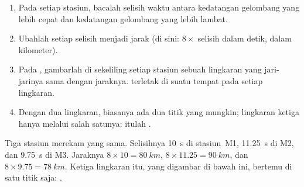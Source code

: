 \begin{method}\label{met:g7:earthquakes:three-circles}
\begin{enumerate}
  \item Pada  setiap stasiun, bacalah selisih waktu antara
        kedatangan gelombang yang lebih cepat dan kedatangan gelombang yang
        lebih lambat.
  \item Ubahlah setiap selisih menjadi jarak (di sini: $8 \times$ selisih
        dalam detik, dalam kilometer).
  \item Pada , gambarlah di sekeliling setiap stasiun sebuah lingkaran
        yang jari-jarinya sama dengan jaraknya.  terletak di suatu
        tempat pada setiap lingkaran.
  \item Dengan dua lingkaran, biasanya ada dua titik yang mungkin; lingkaran
        ketiga hanya melalui salah satunya: itulah .
\end{enumerate}
\end{method}

\begin{example}\label{ex:g7:earthquakes:three-circles}
Tiga stasiun merekam  yang sama. Selisihnya \qty{10}{s} di
stasiun~M1, \qty{11.25}{s} di M2, dan \qty{9.75}{s} di M3. Jaraknya
$8 \times 10 = \qty{80}{km}$, $8 \times 11.25 = \qty{90}{km}$, dan
$8 \times 9.75 = \qty{78}{km}$. Ketiga lingkaran itu, yang digambar di bawah
ini, bertemu di satu titik saja: .
\end{example}

